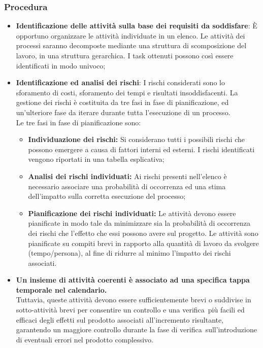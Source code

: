 \subsubsection{Procedura}
\begin{itemize}
    \item \textbf{Identificazione delle attività sulla base dei requisiti da soddisfare}: È opportuno organizzare le attività individuate in un elenco. Le attività dei processi saranno decomposte mediante una struttura di scomposizione del lavoro, in una struttura gerarchica. I task ottenuti possono così essere identificati in modo univoco;
    \item \textbf{Identificazione ed analisi dei rischi}: I rischi considerati sono lo sforamento di costi, sforamento dei tempi e risultati insoddisfacenti. La gestione dei rischi è costituita da tre fasi in fase di pianificazione, ed un'ulteriore fase da iterare durante tutta l'esecuzione di un processo. \\
    Le tre fasi in fase di pianificazione sono: 
    \begin{itemize}
     \item \textbf{Individuazione dei rischi:} Si considerano tutti i possibili rischi che possono emergere a causa di fattori interni ed esterni. I rischi identificati vengono riportati in una tabella esplicativa;
     \item \textbf{Analisi dei rischi individuati:} Ai rischi presenti nell'elenco è necessario associare una probabilità di occorrenza ed una stima dell'impatto sulla corretta esecuzione del processo;
     \item \textbf{Pianificazione dei rischi individuati:} Le attività devono essere pianificate in modo tale da minimizzare sia la probabilità di occorrenza dei rischi che l'effetto che essi possono avere sul progetto. Le attività sono pianificate su compiti brevi in rapporto alla quantità di lavoro da svolgere (tempo/persona), al fine di ridurre al minimo l'impatto dei rischi associati.
    \end{itemize}
     \item \textbf{Un insieme di attività coerenti è associato ad una specifica tappa temporale nel calendario.}\\ Tuttavia, queste attività devono essere sufficientemente brevi o suddivise in sotto-attività brevi per consentire un controllo e una verifica\glo\ più facili ed efficaci degli effetti sul prodotto associati all'incremento risultante, garantendo un maggiore controllo durante la fase di verifica\glo\ sull'introduzione di eventuali errori nel prodotto complessivo. \\ 

\end{itemize}

